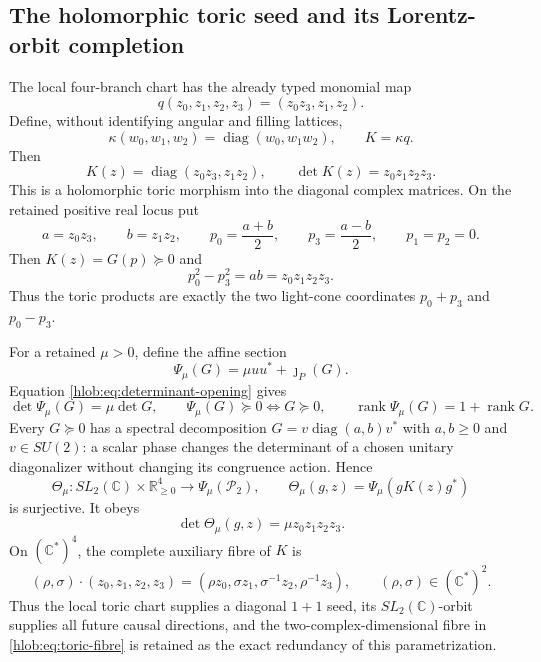 \subsection{The holomorphic toric seed and its Lorentz-orbit completion}
\label{hlob:subsec:toric-seed}

The local four-branch chart has the already typed monomial map
\[
 q(z_0,z_1,z_2,z_3)=(z_0z_3,z_1,z_2).
\]
Define, without identifying angular and filling lattices,
\begin{equation}
 \kappa(w_0,w_1,w_2)=\operatorname{diag}(w_0,w_1w_2),
 \qquad
 K=\kappa q.
 \label{hlob:eq:kappa}
\end{equation}
Then
\begin{equation}
 K(z)=\operatorname{diag}(z_0z_3,z_1z_2),
 \qquad
 \boxed{\det K(z)=z_0z_1z_2z_3.}
 \label{hlob:eq:toric-seed}
\end{equation}
This is a holomorphic toric morphism into the diagonal complex matrices.
On the retained positive real locus put
\[
 a=z_0z_3,\qquad b=z_1z_2,\qquad
 p_0=\frac{a+b}{2},\qquad p_3=\frac{a-b}{2},\qquad p_1=p_2=0.
\]
Then \(K(z)=G(p)\succeq0\) and
\[
 p_0^2-p_3^2=ab=z_0z_1z_2z_3.
\]
Thus the toric products are exactly the two light-cone coordinates
\(p_0+p_3\) and \(p_0-p_3\).

For a retained \(\mu>0\), define the affine section
\begin{equation}
 \Psi_\mu(G)=\mu uu^*+\jmath_P(G).
 \label{hlob:eq:affine-section}
\end{equation}
Equation \eqref{hlob:eq:determinant-opening} gives
\begin{equation}
 \det\Psi_\mu(G)=\mu\det G,\qquad
 \Psi_\mu(G)\succeq0\Longleftrightarrow G\succeq0,\qquad
 \operatorname{rank}\Psi_\mu(G)=1+\operatorname{rank}G.
 \label{hlob:eq:affine-identities}
\end{equation}
Every \(G\succeq0\) has a spectral decomposition
\(G=v\operatorname{diag}(a,b)v^*\) with \(a,b\geq0\) and
\(v\in SU(2)\): a scalar phase changes the determinant of a chosen
unitary diagonalizer without changing its congruence action.  Hence
\begin{equation}
 \Theta_\mu:SL_2(\mathbb C)\times\mathbb R_{\geq0}^4
 \longrightarrow
 \Psi_\mu(\mathcal P_2),\qquad
 \Theta_\mu(g,z)=\Psi_\mu(gK(z)g^*)
 \label{hlob:eq:orbit-completion}
\end{equation}
is surjective.  It obeys
\begin{equation}
 \det\Theta_\mu(g,z)=\mu z_0z_1z_2z_3.
 \label{hlob:eq:orbit-completion-det}
\end{equation}
On \((\mathbb C^*)^4\), the complete auxiliary fibre of \(K\) is
\begin{equation}
 (\rho,\sigma)\cdot(z_0,z_1,z_2,z_3)
 =(\rho z_0,\sigma z_1,\sigma^{-1}z_2,\rho^{-1}z_3),
 \qquad(\rho,\sigma)\in(\mathbb C^*)^2.
 \label{hlob:eq:toric-fibre}
\end{equation}
Thus the local toric chart supplies a diagonal \(1+1\) seed, its
\(SL_2(\mathbb C)\)-orbit supplies all future causal directions, and the
two-complex-dimensional fibre in \eqref{hlob:eq:toric-fibre} is retained
as the exact redundancy of this parametrization.

